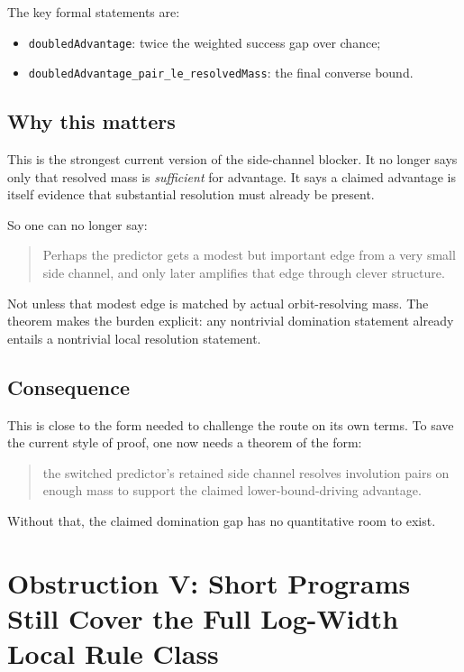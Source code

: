 \documentclass[11pt]{article}
\theoremstyle{remark}
\begin{document}
\noindent
The key formal statements are:
\begin{itemize}[leftmargin=1.5em]
  \item \texttt{doubledAdvantage}: twice the weighted success gap over chance;
  \item \texttt{doubledAdvantage\_pair\_le\_resolvedMass}: the final converse bound.
\end{itemize}

\subsection{Why this matters}

This is the strongest current version of the side-channel blocker.  It no longer says only that
resolved mass is \emph{sufficient} for advantage.  It says a claimed advantage is itself evidence
that substantial resolution must already be present.

So one can no longer say:
\begin{quote}
Perhaps the predictor gets a modest but important edge from a very small side channel, and only
later amplifies that edge through clever structure.
\end{quote}

Not unless that modest edge is matched by actual orbit-resolving mass.  The theorem makes the
burden explicit: any nontrivial domination statement already entails a nontrivial local resolution
statement.

\subsection{Consequence}

This is close to the form needed to challenge the route on its own terms.  To save the current
style of proof, one now needs a theorem of the form:
\begin{quote}
the switched predictor's retained side channel resolves involution pairs on enough mass to support
the claimed lower-bound-driving advantage.
\end{quote}

Without that, the claimed domination gap has no quantitative room to exist.

\section{Obstruction V: Short Programs Still Cover the Full Log-Width Local Rule Class}
\end{document}
